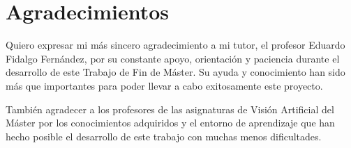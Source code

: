 \documentclass[12pt,a4paper,onecolumn,oneside]{report}
\begin{document}
\section{Agradecimientos}

Quiero expresar mi más sincero agradecimiento a mi tutor, el profesor Eduardo Fidalgo Fernández, por su constante apoyo, orientación y paciencia durante el desarrollo de este Trabajo de Fin de Máster. Su ayuda y conocimiento han sido más que importantes para poder llevar a cabo exitosamente este proyecto.

También agradecer a los profesores de las asignaturas de Visión Artificial del Máster por los conocimientos adquiridos y el entorno de aprendizaje que han hecho posible el desarrollo de este trabajo con muchas menos dificultades.



\renewcommand\bibname{Lista de referencias}

\end{document}

